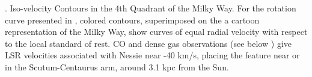 \textbf{\label{fig:topview}}. Iso-velocity Contours in the 4th Quadrant of the Milky Way. For the rotation curve presented in \citet{McClureGriffiths2007}, colored contours, superimposed on the a cartoon representation of the Milky Way, show curves of equal radial velocity with respect to the local standard of rest. CO and dense gas observations (see below ) give LSR velocities associated with Nessie near -40 km/s, placing the feature near or in the Scutum-Centaurus arm, around 3.1 kpc from the Sun. 